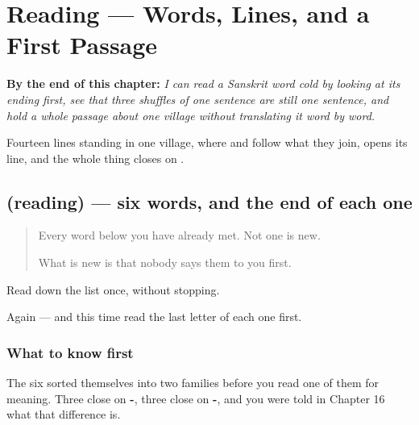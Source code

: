 
\chapter{Reading — Words, Lines, and a First Passage}
\label{ch:sa-prathama-pathanam}

\begin{chapteropening}
\textbf{By the end of this chapter:} \emph{I can read a Sanskrit word cold by looking at its ending first, see that three shuffles of one sentence are still one sentence, and hold a whole passage about one village without translating it word by word.}

Fourteen lines standing in one village, where  and  follow what they join,  opens its line, and the whole thing closes on .
\end{chapteropening}

\section[(reading)]{(reading) — six words, and the end of each one}

\label{lesson:SA-C64-words}



\begin{quote}
Every word below you have already met. Not one is new.

What is new is that nobody says them to you first.
\end{quote}

\begin{tcolorbox}[breakable,skin=enhanced,colback=orange!6,colframe=orange!45!black,boxrule=0.5pt,arc=1mm,left=6pt,right=6pt,top=4pt,bottom=4pt,fonttitle=\bfseries,title={Read this}]
\begin{quote}
     
\end{quote}

Read down the list once, without stopping.

Again — and this time read the last letter of each one first.
\end{tcolorbox}

\subsection*{What to know first}
The six sorted themselves into two families before you read one of them for meaning. Three close on \textbf{-}, three close on \textbf{-}, and you were told in Chapter 16 what that difference is.

